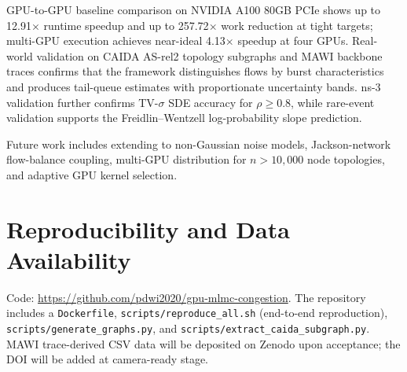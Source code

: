 \documentclass[journal]{IEEEtran}
\begin{document}
GPU-to-GPU baseline comparison on NVIDIA A100 80GB PCIe shows up to 12.91$\times$ runtime
speedup and up to 257.72$\times$ work reduction at tight targets; multi-GPU execution achieves
near-ideal 4.13$\times$ speedup at four GPUs. Real-world validation on CAIDA AS-rel2 topology
subgraphs and MAWI backbone traces confirms that the framework distinguishes flows by burst
characteristics and produces tail-queue estimates with proportionate uncertainty bands. ns-3
validation further confirms TV-$\sigma$ SDE accuracy for $\rho\geq0.8$, while rare-event
validation supports the Freidlin--Wentzell log-probability slope prediction.

Future work includes extending to non-Gaussian noise models, Jackson-network flow-balance
coupling, multi-GPU distribution for $n>10{,}000$ node topologies, and adaptive GPU kernel
selection.

\section*{Reproducibility and Data Availability}

Code: \url{https://github.com/pdwi2020/gpu-mlmc-congestion}. The repository includes a
\texttt{Dockerfile}, \texttt{scripts/reproduce\_all.sh} (end-to-end reproduction),
\texttt{scripts/generate\_graphs.py}, and \texttt{scripts/extract\_caida\_subgraph.py}.
MAWI trace-derived CSV data will be deposited on Zenodo upon acceptance; the DOI will be
added at camera-ready stage.



\end{document}
